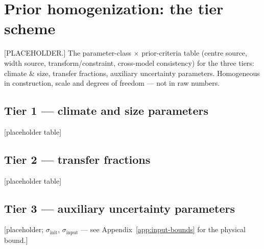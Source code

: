 \documentclass[../HIKET_draft_v1.tex]{subfiles}
\begin{document}
\section{Prior homogenization: the tier scheme}
\label{app:priors}

[PLACEHOLDER.] The parameter-class $\times$ prior-criteria table (centre source,
width source, transform/constraint, cross-model consistency) for the three tiers:
climate \& size, transfer fractions, auxiliary uncertainty parameters. Homogeneous
in construction, scale and degrees of freedom --- not in raw numbers.

\subsection{Tier 1 --- climate and size parameters}
[placeholder table]

\subsection{Tier 2 --- transfer fractions}
[placeholder table]

\subsection{Tier 3 --- auxiliary uncertainty parameters}
[placeholder; $\sigma_{\mathrm{init}}$, $\sigma_{\mathrm{input}}$ ---
see Appendix~\ref{app:input-bounds} for the physical bound.]
\end{document}
